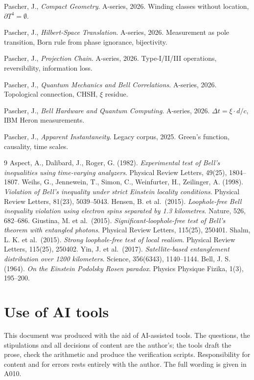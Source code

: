 \begin{description}[leftmargin=3.2em,style=sameline,itemsep=0.3em]
\small
\item[{A030}] Pascher, J., \emph{Compact Geometry}. A-series, 2026.
  Winding classes without location, $\partial T^4 = \emptyset$.
\item[{A070}] Pascher, J., \emph{Hilbert-Space Translation}. A-series, 2026.
  Measurement as pole transition, Born rule from phase ignorance, bijectivity.
\item[{A090}] Pascher, J., \emph{Projection Chain}. A-series, 2026.
  Type-I/II/III operations, reversibility, information loss.
\item[{A160}] Pascher, J., \emph{Quantum Mechanics and Bell Correlations}.
  A-series, 2026. Topological connection, CHSH, $\xi$ residue.
\item[{A165}] Pascher, J., \emph{Bell Hardware and Quantum Computing}.
  A-series, 2026. $\Delta t = \xi \cdot d/c$, IBM Heron measurements.
\item[{Doc.~131}] Pascher, J., \emph{Apparent Instantaneity}.
  Legacy corpus, 2025. Green's function, causality, time scales.
\end{description}

\begin{thebibliography}{9}
\small
{}
Aspect, A., Dalibard, J., Roger, G. (1982).
\emph{Experimental test of Bell's inequalities using time-varying analyzers}.
Physical Review Letters, 49(25), 1804--1807.
Weihs, G., Jennewein, T., Simon, C., Weinfurter, H., Zeilinger, A. (1998).
\emph{Violation of Bell's inequality under strict Einstein locality conditions}.
Physical Review Letters, 81(23), 5039--5043.
Hensen, B. et al.\ (2015).
\emph{Loophole-free Bell inequality violation using electron spins
separated by 1.3 kilometres}.
Nature, 526, 682--686.
Giustina, M. et al.\ (2015).
\emph{Significant-loophole-free test of Bell's theorem with entangled photons}.
Physical Review Letters, 115(25), 250401.
Shalm, L. K. et al.\ (2015).
\emph{Strong loophole-free test of local realism}.
Physical Review Letters, 115(25), 250402.
Yin, J. et al.\ (2017).
\emph{Satellite-based entanglement distribution over 1200 kilometers}.
Science, 356(6343), 1140--1144.
Bell, J. S. (1964).
\emph{On the Einstein Podolsky Rosen paradox}.
Physics Physique Fizika, 1(3), 195--200.
\end{thebibliography}

\section{Use of AI tools}

This document was produced with the aid of AI-assisted tools. The questions, the
stipulations and all decisions of content are the author's; the tools draft the
prose, check the arithmetic and produce the verification scripts. Responsibility
for content and for errors rests entirely with the author. The full wording is
given in A010.
